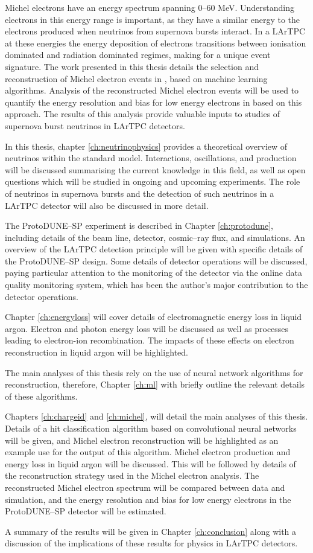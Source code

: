 Michel electrons have an energy spectrum spanning 0--60 MeV. Understanding
electrons in this energy range is important, as they have a similar energy to 
the electrons produced when neutrinos from supernova bursts interact. In a 
LArTPC at these energies the energy deposition of electrons transitions 
between ionisation dominated and radiation dominated regimes, making for a 
unique event signature. The work presented in this thesis details the 
selection and reconstruction of Michel electron events in \protodune{}, based 
on machine learning algorithms. Analysis of the reconstructed Michel electron 
events will be used to quantify the energy resolution and bias for low energy 
electrons in \protodune{} based on this approach. The results of this analysis 
provide valuable inputs to studies of supernova burst neutrinos in LArTPC 
detectors.

In this thesis, chapter \ref{ch:neutrinophysics} provides a theoretical 
overview of neutrinos within the standard model. Interactions, oscillations, 
and production will be discussed summarising the current knowledge in this
field, as well as open questions which will be studied in ongoing and upcoming 
experiments. The role of neutrinos in supernova bursts and the detection of 
such neutrinos in a LArTPC detector will also be discussed in more detail.

The ProtoDUNE--SP experiment is described in Chapter \ref{ch:protodune},
including details of the beam line, detector, cosmic--ray flux, and simulations.
An overview of the LArTPC detection principle will be given with specific
details of the ProtoDUNE--SP design. Some details of detector operations will be
discussed, paying particular attention to the monitoring of the detector via the
online data quality monitoring system, which has been the author's major 
contribution to the detector operations.

Chapter \ref{ch:energyloss} will cover details of electromagnetic energy loss
in liquid argon. Electron and photon energy loss will be discussed as well as
processes leading to electron-ion recombination. The impacts of these effects on
electron reconstruction in liquid argon will be highlighted.

The main analyses of this thesis rely on the use of neural network algorithms
for reconstruction, therefore, Chapter \ref{ch:ml} with briefly outline the
relevant details of these algorithms.

Chapters \ref{ch:chargeid} and \ref{ch:michel}, will detail the main analyses 
of this thesis. Details of a hit classification algorithm based on 
convolutional neural networks will be given, and Michel electron 
reconstruction will be highlighted as an example use for the output of this 
algorithm. Michel electron production and energy loss in liquid argon will be 
discussed. This will be followed by details of the reconstruction strategy 
used in the Michel electron analysis. The reconstructed Michel electron 
spectrum will be compared between data and simulation, and the energy 
resolution and bias for low energy electrons in the ProtoDUNE--SP detector 
will be estimated. 

A summary of the results will be given in Chapter \ref{ch:conclusion} along 
with a discussion of the implications of these results for physics in LArTPC 
detectors.

